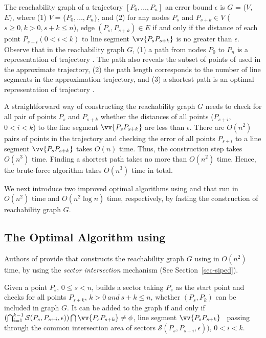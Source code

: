 The reachability graph of a trajectory ${[P_0, \ldots, P_n]}$ \wrt an error bound $\epsilon$ is $G$ = ($V$, $E)$, where (1) $V = \{P_0, \ldots, P_n\}$, and (2) for any nodes $P_s$ and $P_{s+k} \in V$ ($s\ge 0, k>0, s+k\le n$), edge $(P_s, P_{s+k}) \in E$ if and only if the distance of each point $P_{s+i} (0<i<k)$ to line segment $\vv{P_sP_{s+k}}$ is no greater than $\epsilon$.
%
Observe that in the reachability graph $G$, (1) a path from nodes $P_0$ to $P_{n}$ is a representation of trajectory . The path also reveals the subset of points of  used in the approximate trajectory, (2) the path length corresponds to the number of line segments in the approximation trajectory, and 
(3) a shortest path is an optimal representation of trajectory .

A straightforward way of constructing the reachability graph $G$ needs to check for all pair of points $P_s$ and $P_{s+k}$ whether the distances of all points ($P_{s+i}$, $0<i<k$) to the line segment $\vv{P_sP_{s+k}}$ are less than $\epsilon$.
There are $O(n^2)$ pairs of points in the trajectory and checking the error of all points $P_{s+i}$ to a line segment $\vv{P_sP_{s+k}}$ takes $O(n)$ time.
Thus, the construction step takes $O(n^3)$ time.
Finding a shortest path takes no more than $O(n^2)$ time. Hence, the brute-force algorithm takes $O(n^3)$ time in total.

We next introduce two improved optimal \lsa algorithms using \ped and \sed that run in $O(n^2)$ time and $O(n^2 \log n)$ time, respectively, by fasting the construction of reachability graph $G$.

\subsection{The Optimal Algorithm using \ped}
Authors of \cite{Chan:Optimal} provide \oped that constructs the reachability graph $G$ using \ped in $O(n^2)$ time, by using the \textit{sector intersection} mechanism (See Section~\ref{sec-siped}). 

Given a point $P_s$, $0 \le s < n$, \oped builds a sector taking $P_s$ as the start point and checks for all points $P_{s+k}$, $k>0 ~and~ s+k \le n$, whether $(P_s, P_k)$ can be included in graph $G$. It can be added to the graph if and only if $(\bigcap_{i=1}^{k-1}\mathcal{S}(P_s, P_{s+i}, \epsilon)) \bigcap \vv{P_sP_{s+k}} \ne \phi$, \ie line segment $\vv{P_sP_{s+k}}$ ~passing through the common intersection area of sectors $\mathcal{S}(P_s, P_{s+i}, \epsilon))$, $0<i<k$. 

